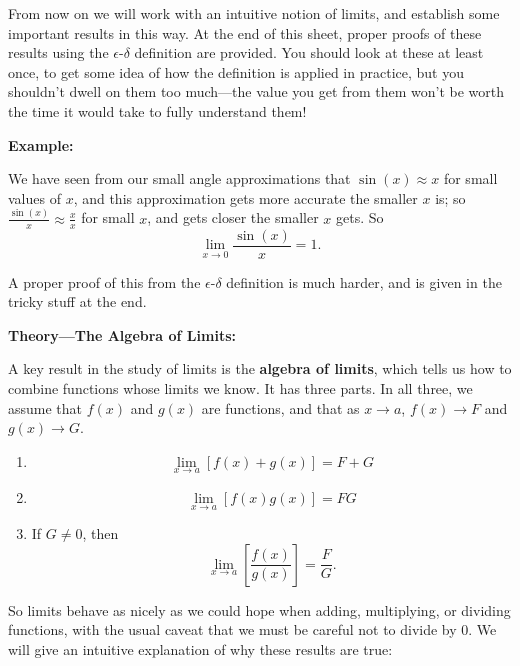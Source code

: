 \documentclass{article}
\begin{document}
From now on we will work with an intuitive notion of limits, and establish some important results in this way. At the end of this sheet, proper proofs of these results using the $\epsilon$-$\delta$ definition are provided. You should look at these at least once, to get some idea of how the definition is applied in practice, but you shouldn't dwell on them too much---the value you get from them won't be worth the time it would take to fully understand them!

\clearpage

\textbf{Example:}\bigskip



We have seen from our small angle approximations that $\sin(x)\approx x$ for small values of $x$, and this approximation gets more accurate the smaller $x$ is; so $\frac{\sin(x)}{x}\approx\frac{x}{x}$ for small $x$, and gets closer the smaller $x$ gets. So
\[\lim_{x\to 0}\frac{\sin(x)}{x}=1.\]

A proper proof of this from the $\epsilon$-$\delta$ definition is much harder, and is given in the tricky stuff at the end.\bigskip


\clearpage









\textbf{Theory---The Algebra of Limits:}

\vspace{5mm}

A key result in the study of limits is the \textbf{algebra of limits}, which tells us how to combine functions whose limits we know. It has three parts. In all three, we assume that $f(x)$ and $g(x)$ are functions, and that as $x\to a$, $f(x)\to F$ and $g(x)\to G$.
\begin{enumerate}
	\item \[\lim_{x\to a}[f(x)+g(x)]=F+G\]
	\item \[\lim_{x\to a}[f(x)g(x)] = FG\]
	\item If $G\neq 0$, then \[\lim_{x\to a}\left[\frac{f(x)}{g(x)}\right]=\frac{F}{G}.\]
\end{enumerate}

So limits behave as nicely as we could hope when adding, multiplying, or dividing functions, with the usual caveat that we must be careful not to divide by 0. We will give an intuitive explanation of why these results are true:
\end{document}
